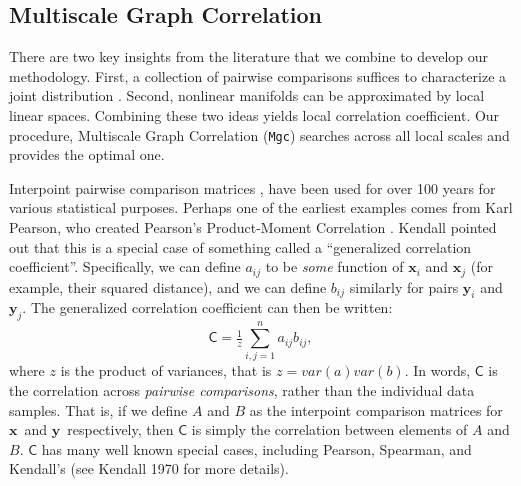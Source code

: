 \documentclass[11pt]{article}
\providecommand{\sct}[1]{{\sc \texttt{#1}}}
\providecommand{\mb}[1]{\boldsymbol{#1}}
\newcommand{\G}{\mathsf{C}}
\newcommand{\Mgc}{\sct{Mgc}}
\newcommand{\mbx}{\ensuremath{\mb{x}}}
\newcommand{\mby}{\ensuremath{\mb{y}}}
\begin{document}
\subsection{Multiscale Graph Correlation} 
\label{s:mgc}
There are two key insights from the literature that we combine to develop our methodology.  First, a collection of pairwise comparisons  suffices to characterize a joint distribution \cite{Maa1996}.  Second, nonlinear manifolds can be approximated by local linear spaces.  Combining these two ideas yields local correlation coefficient. Our procedure, Multiscale Graph Correlation (\Mgc) searches across all local scales and provides the optimal one.   

Interpoint pairwise comparison matrices \cite{Maa83}, have been used for over 100 years for various statistical purposes. Perhaps one of the earliest examples  comes from  Karl Pearson, who created Pearson's Product-Moment Correlation \cite{Pearson1895}.  
Kendall  \cite{KendallBook} pointed out that this is a special case of something called a  ``generalized correlation coefficient''.
Specifically, we can define $a_{ij}$ to be \emph{some} function of $\mbx_i$ and $\mbx_j$  (for example, their squared distance), and we can define $b_{ij}$ similarly for pairs $\mby_i$ and $\mby_j$.  The generalized correlation coefficient can then be written:
\begin{equation}
\label{generalCoef}
\G= \tfrac{1}{z} {\textstyle \sum_{i,j=1}^n a_{ij} b_{ij} }
, 
\end{equation}
where $z$ is the product of variances, that is $z=var(a) var(b)$.
In words, $\G$ is the correlation across \emph{pairwise comparisons}, rather than the individual data samples.  That is, if we define $A$ and $B$ as the interpoint comparison matrices for \mbx~and \mby~respectively, then $\G$ is simply the correlation between elements of $A$ and $B$.    
$\G$ has many well known special cases, including Pearson, Spearman, and Kendall's (see Kendall 1970 for more details). 
\end{document}

